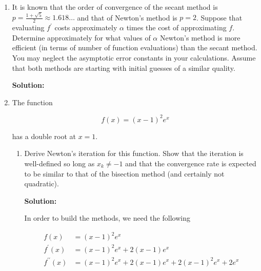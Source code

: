 \documentclass[12pt]{article}
\newcommand{\abs}[1]{\left| #1 \right|}
\newcommand{\ceil}[1]{\left\lceil #1 \right\rceil}
\newcommand{\pprime}{\prime \prime}
\begin{document}
\begin{enumerate}
\begin{enumerate}
  {\bf Solution:}

  Page 49 of the text gives the equation to reduce the convergence error by a factor of 10.
  The number of iterations is defined as $k = \ceil{1/rate}$, for which $rate = -\log_{10}\abs{g^{\prime}\left( x^{*}\right)}$.
  Using this equation, we can get the convergence rate to be

  \begin{align*}
    g^{\prime}\left( \frac{1}{4}\right) &= \frac{1}{2}\\
    \Rightarrow rate &= -\log_{10}\abs{2^{-1}} = \frac{3}{10}\\
    \intertext{So it takes $k = \ceil{1/rate}$ iterations to reduce the error by more than an order of magnitude, resulting in}
    k &= \ceil{\left( \frac{3}{10}\right)^{-1}} = 4
  \end{align*}
\end{enumerate}

\item It is known that the order of convergence of the secant method is $p = \frac{1 + \sqrt{5}}{2} \approx 1.618\ldots$
and that of Newton's method is $p = 2$. Suppose that evaluating $f^{\prime}$ costs approximately
$\alpha$ times the cost of approximating $f$. Determine approximately for what values of $\alpha$
Newton's method is more efficient (in terms of number of function evaluations) than the secant method.
You may neglect the asymptotic error constants in your calculations. Assume that both methods
are starting with initial guesses of a similar quality.

{\bf Solution:}

\item The function

\[
f(x) = (x-1)^{2}e^{x}
\]

has a double root at $x = 1$.

\begin{enumerate}
\item Derive Newton's iteration for this function. Show that the iteration is well-defined
so long as $x_{k} \neq -1$ and that the convergence rate is expected to be similar to that
of the bisection method (and certainly not quadratic).

{\bf Solution:}

In order to build the methods, we need the following

\begin{align*}
f(x) &= (x-1)^{2}e^{x}\\
f^{\prime}(x) &= (x-1)^{2}e^{x} + 2(x-1)e^{x}\\
f^{\pprime}(x) &= (x-1)^{2}e^{x} + 2(x-1)e^{x} + 2(x-1)^{2}e^{x} + 2e^{x}
\end{align*}


\end{enumerate}
\end{enumerate}
\end{document}
